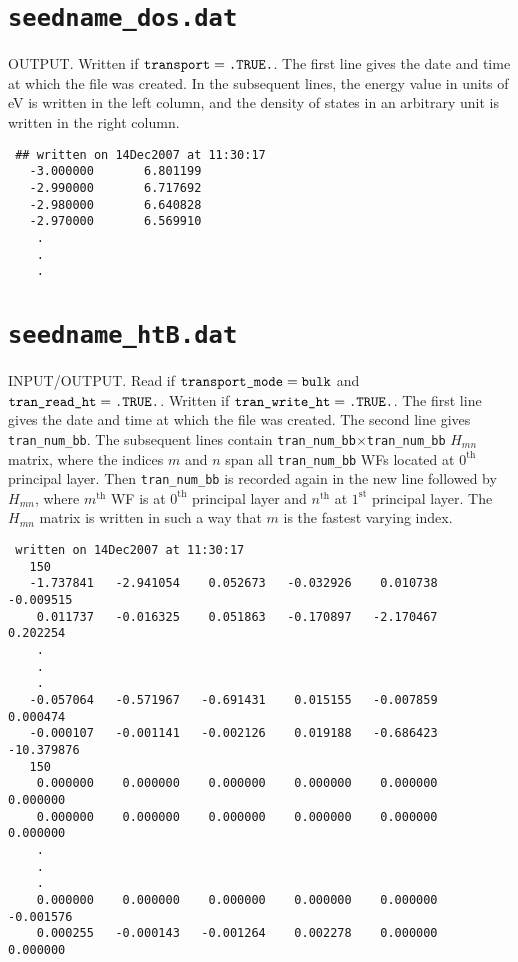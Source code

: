 \section{{\tt seedname\_dos.dat}}
OUTPUT. Written if $\verb#transport#=\verb#.TRUE.#$.
The first line gives the date and
time at which the file was created. 
In the subsequent lines, the energy value
in units of eV is written in the left column,
and the density of states in an arbitrary unit
is written in the right column.
 
\begin{verbatim}
 ## written on 14Dec2007 at 11:30:17
   -3.000000       6.801199
   -2.990000       6.717692
   -2.980000       6.640828
   -2.970000       6.569910
    .
    .
    .
\end{verbatim}


\section{{\tt seedname\_htB.dat}}

INPUT/OUTPUT. 
Read if 
$\verb#transport_mode#=\verb#bulk#$
and $\verb#tran_read_ht#=\verb#.TRUE.#$.
Written if $\verb#tran_write_ht#=\verb#.TRUE.#$. 
The first line gives the date and
time at which the file was created. 
The second line gives \verb#tran_num_bb#.
The subsequent lines contain 
\verb#tran_num_bb#$\times$\verb#tran_num_bb#
$H_{mn}$ matrix, where the indices
$m$ and $n$ span all \verb#tran_num_bb# WFs
located at $0^{\mathrm{th}}$ principal layer.
Then \verb#tran_num_bb# is recorded again in the new line 
followed by $H_{mn}$, where
$m^{\mathrm{th}}$ WF is 
at $0^{\mathrm{th}}$ principal layer
and $n^{\mathrm{th}}$ at $1^{\mathrm{st}}$ principal layer.
The $H_{mn}$ matrix is written in such a way that
$m$ is the fastest varying index.

\begin{verbatim}
 written on 14Dec2007 at 11:30:17
   150
   -1.737841   -2.941054    0.052673   -0.032926    0.010738   -0.009515
    0.011737   -0.016325    0.051863   -0.170897   -2.170467    0.202254
    .
    .
    .
   -0.057064   -0.571967   -0.691431    0.015155   -0.007859    0.000474
   -0.000107   -0.001141   -0.002126    0.019188   -0.686423  -10.379876
   150
    0.000000    0.000000    0.000000    0.000000    0.000000    0.000000
    0.000000    0.000000    0.000000    0.000000    0.000000    0.000000
    .
    .
    .
    0.000000    0.000000    0.000000    0.000000    0.000000   -0.001576
    0.000255   -0.000143   -0.001264    0.002278    0.000000    0.000000
\end{verbatim}

